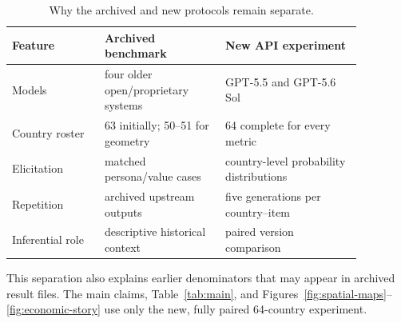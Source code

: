 \begin{table}[!htbp]
\centering
\caption{Why the archived and new protocols remain separate.}
\small
\begin{tabular}{p{0.23\linewidth}p{0.30\linewidth}p{0.34\linewidth}}
\toprule
\rowcolor{tablehead}
Feature & Archived benchmark & New API experiment \\
\midrule
Models & four older open/proprietary systems & GPT-5.5 and GPT-5.6 Sol \\
Country roster & 63 initially; 50--51 for geometry & 64 complete for every metric \\
Elicitation & matched persona/value cases & country-level probability distributions \\
Repetition & archived upstream outputs & five generations per country--item \\
Inferential role & descriptive historical context & paired version comparison \\
\bottomrule
\end{tabular}
\end{table}

This separation also explains earlier denominators that may appear in archived result
files. The main claims, Table~\ref{tab:main}, and
Figures~\ref{fig:spatial-maps}--\ref{fig:economic-story} use only the new, fully paired 64-country
experiment.
\FloatBarrier
